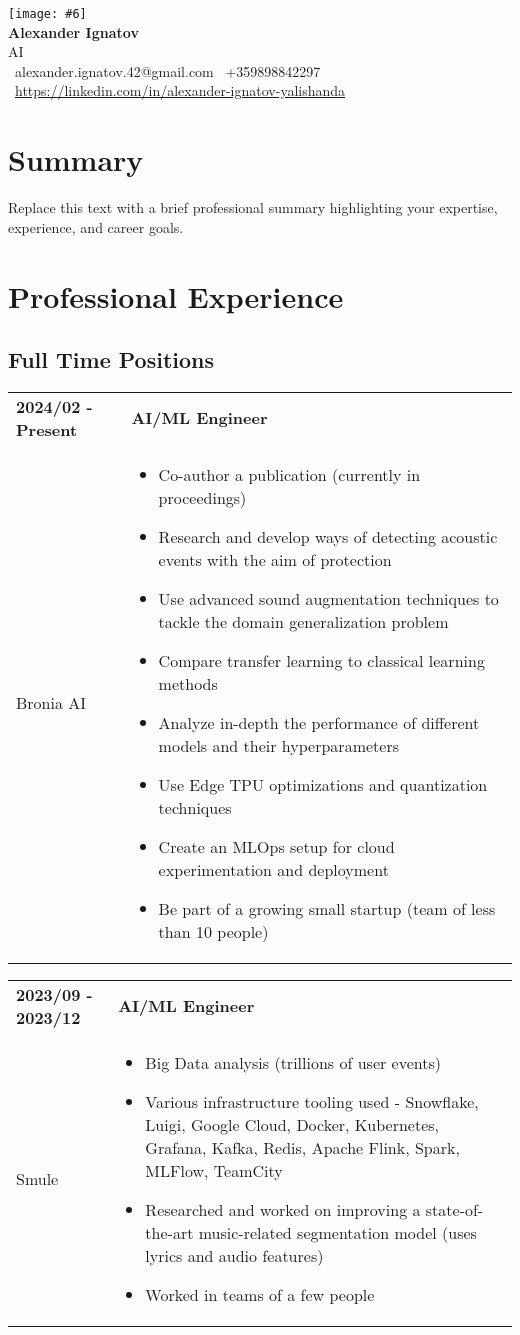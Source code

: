\documentclass[11pt,a4paper]{article}
\newcommand{\cvheader}[6]{
    \begin{center}
        \texttt{[image: \#6]} \\[4pt]
            {\Huge\textbf{#1}}\\[4pt]
            {\large #2}\\[2pt]
            \faEnvelope\ #3 \quad \faPhone\ #4 \\[2pt]
            \faLinkedin\ \href{#5}{#5}
    \end{center}
}
\newcommand{\workblock}[4]{
    \begin{tabular}{p{0.25\columnwidth}p{0.65\columnwidth}}
        \textbf{#1} & \textbf{#2} \\
        #3 & #4 \\
    \end{tabular}
}
\begin{document}
\cvheader{Alexander Ignatov}
         {AI}
         {alexander.ignatov.42@gmail.com}
         {+359898842297}
         {https://linkedin.com/in/alexander-ignatov-yalishanda}
         {az.jpg}


\section{Summary}
Replace this text with a brief professional summary highlighting your expertise, experience, and career goals.
    

\section{Professional Experience}
    \subsection{Full Time Positions}
    \workblock{2024/02 - Present}{AI/ML Engineer}
    {Bronia AI}{
        \begin{itemize}
            \item Co-author a publication (currently in proceedings)
            \item Research and develop ways of detecting acoustic events with the aim of protection
            \item Use advanced sound augmentation techniques to tackle the domain generalization problem
            \item Compare transfer learning to classical learning methods
            \item Analyze in-depth the performance of different models and their hyperparameters
            \item Use Edge TPU optimizations and quantization techniques
            \item Create an MLOps setup for cloud experimentation and deployment
            \item Be part of a growing small startup (team of less than 10 people)
        \end{itemize}
    }

    \workblock{2023/09 - 2023/12}{AI/ML Engineer}
    {Smule}{
        \begin{itemize}
            \item Big Data analysis (trillions of user events)
            \item Various infrastructure tooling used - Snowflake, Luigi, Google Cloud, Docker, Kubernetes, Grafana, Kafka, Redis, Apache Flink, Spark, MLFlow, TeamCity
            \item Researched and worked on improving a state-of-the-art music-related segmentation model (uses lyrics and audio features)
            \item Worked in teams of a few people
        \end{itemize}
    }
    
\end{document}
